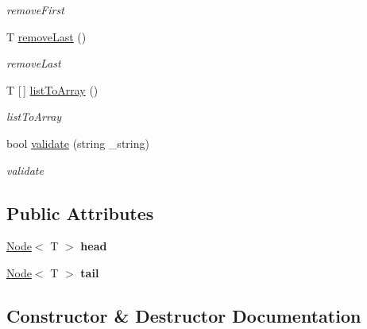 \begin{DoxyCompactItemize}
\begin{DoxyCompactList}\small\item\em remove\+First \end{DoxyCompactList}\item 
T \mbox{\hyperlink{class_estrcuturas_dinamicas_1_1_my_linked_list_adfd3488237f3ed5e59768d177ab22fca}{remove\+Last}} ()
\begin{DoxyCompactList}\small\item\em remove\+Last \end{DoxyCompactList}\item 
T \mbox{[}$\,$\mbox{]} \mbox{\hyperlink{class_estrcuturas_dinamicas_1_1_my_linked_list_af31dd35b97e335562f10c015aafbb354}{list\+To\+Array}} ()
\begin{DoxyCompactList}\small\item\em list\+To\+Array \end{DoxyCompactList}\item 
bool \mbox{\hyperlink{class_estrcuturas_dinamicas_1_1_my_linked_list_a442e0c07ad2848f88545d4a6d7e4dec6}{validate}} (string \+\_\+string)
\begin{DoxyCompactList}\small\item\em validate \end{DoxyCompactList}\end{DoxyCompactItemize}
\subsection*{Public Attributes}
\begin{DoxyCompactItemize}
\item 
\mbox{\label{class_estrcuturas_dinamicas_1_1_my_linked_list_accccfe5a5182ad4ddf3f04bc19b5367c}} 
\mbox{\hyperlink{class_estrcuturas_dinamicas_1_1_node}{Node}}$<$ T $>$ {\bfseries head}
\item 
\mbox{\label{class_estrcuturas_dinamicas_1_1_my_linked_list_a92af38d021ceda93254f9b56ff2428c2}} 
\mbox{\hyperlink{class_estrcuturas_dinamicas_1_1_node}{Node}}$<$ T $>$ {\bfseries tail}
\end{DoxyCompactItemize}


\subsection{Constructor \& Destructor Documentation}
\mbox{\label{class_estrcuturas_dinamicas_1_1_my_linked_list_a72b7dc72745511378a8847937c8325f6}} 

